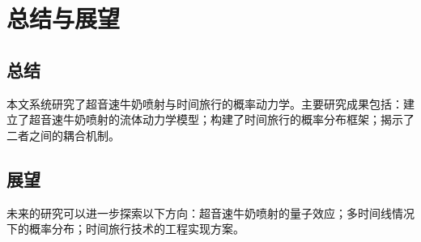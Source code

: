 \chapter{总结与展望}

\section{总结}

本文系统研究了超音速牛奶喷射与时间旅行的概率动力学。主要研究成果包括：建立了超音速牛奶喷射的流体动力学模型；构建了时间旅行的概率分布框架；揭示了二者之间的耦合机制。

\section{展望}

未来的研究可以进一步探索以下方向：超音速牛奶喷射的量子效应；多时间线情况下的概率分布；时间旅行技术的工程实现方案。
